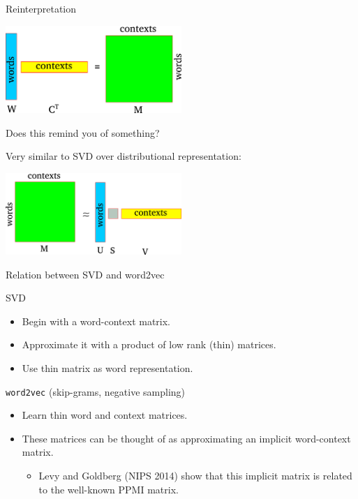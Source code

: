 \documentclass[compress]{beamer}
\begin{document}
\begin{frame}{Reinterpretation}

    \includegraphics[width=0.5\textwidth]{distsim/word_context_matrix.png}

    \vspace{1em}
    Does this remind you of something?
    \pause

    \vspace{0.3em}
    Very similar to SVD over distributional representation:
    \vspace{1em}

    \includegraphics[width=0.5\textwidth]{distsim/svd.png}

\end{frame}

\begin{frame}{Relation between SVD and word2vec}
    \begin{block}{SVD}
        \begin{itemize}
            \item Begin with a word-context matrix.
            \item Approximate it with a product of low rank (thin) matrices.
            \item Use thin matrix as word representation.
        \end{itemize}
    \end{block}
    \begin{block}{\texttt{word2vec} (skip-grams, negative sampling)}
        \begin{itemize}
            \item Learn thin word and context matrices.
            \item These matrices can be thought of as approximating an implicit word-context
                matrix.
                \begin{itemize}
                    \item Levy and Goldberg (NIPS 2014) show that this
                        implicit matrix is related to the well-known PPMI matrix.
                \end{itemize}
        \end{itemize}
    \end{block}
\end{frame}
\end{document}
